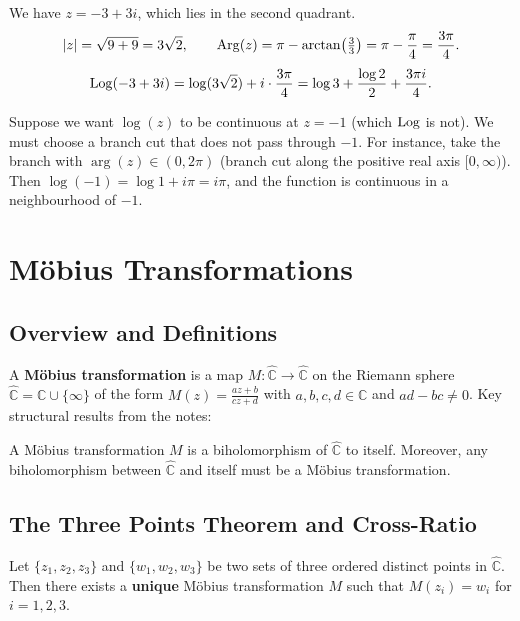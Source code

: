 \documentclass[11pt, a4paper]{article}
\begin{document}
\begin{exbox}
We have $z=-3+3i$, which lies in the second quadrant.
\[
  |z| = \sqrt{9+9} = 3\sqrt{2}, \qquad
  \operatorname{Arg}(z) = \pi - \arctan\!\left(\tfrac{3}{3}\right) = \pi - \frac{\pi}{4} = \frac{3\pi}{4}.
\]
\[
  \operatorname{Log}(-3+3i) = \log(3\sqrt{2}) + i\cdot\frac{3\pi}{4} = \log 3 + \frac{\log 2}{2} + \frac{3\pi i}{4}.
\]
\end{exbox}

\begin{exbox}
Suppose we want $\log(z)$ to be continuous at $z=-1$ (which $\operatorname{Log}$ is not). We must choose a branch cut that does not pass through $-1$. For instance, take the branch with $\arg(z)\in(0,2\pi)$ (branch cut along the positive real axis $[0,\infty)$). Then $\log(-1)=\log 1 + i\pi = i\pi$, and the function is continuous in a neighbourhood of $-1$.
\end{exbox}

\section{M\"obius Transformations}

\subsection*{Overview and Definitions}

A \textbf{M\"obius transformation} is a map $M:\hat{\mathbb{C}}\to\hat{\mathbb{C}}$ on the Riemann sphere $\hat{\mathbb{C}}=\mathbb{C}\cup\{\infty\}$ of the form $M(z)=\frac{az+b}{cz+d}$ with $a,b,c,d\in\mathbb{C}$ and $ad-bc\neq 0$. Key structural results from the notes:

\begin{thmbox}
A M\"obius transformation $M$ is a biholomorphism of $\hat{\mathbb{C}}$ to itself. Moreover, any biholomorphism between $\hat{\mathbb{C}}$ and itself must be a M\"obius transformation.
\end{thmbox}

\subsection*{The Three Points Theorem and Cross-Ratio}

\begin{thmbox}
Let $\{z_1,z_2,z_3\}$ and $\{w_1,w_2,w_3\}$ be two sets of three ordered distinct points in $\hat{\mathbb{C}}$. Then there exists a \textbf{unique} M\"obius transformation $M$ such that $M(z_i)=w_i$ for $i=1,2,3$.
\end{thmbox}
\end{document}
